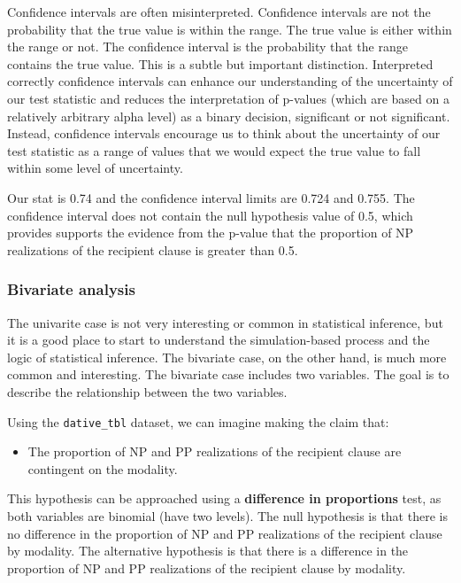 \documentclass[
  letterpaper,
]{latex/krantz}
\providecommand{\tightlist}{%
  \setlength{\itemsep}{0pt}\setlength{\parskip}{0pt}}\usepackage{longtable,booktabs,array}
\theoremstyle{definition}
\theoremstyle{remark}
\begin{document}
Confidence intervals are often misinterpreted. Confidence intervals are
not the probability that the true value is within the range. The true
value is either within the range or not. The confidence interval is the
probability that the range contains the true value. This is a subtle but
important distinction. Interpreted correctly confidence intervals can
enhance our understanding of the uncertainty of our test statistic and
reduces the interpretation of p-values (which are based on a relatively
arbitrary alpha level) as a binary decision, significant or not
significant. Instead, confidence intervals encourage us to think about
the uncertainty of our test statistic as a range of values that we would
expect the true value to fall within some level of uncertainty.

Our stat is 0.74 and the confidence interval limits are 0.724 and 0.755.
The confidence interval does not contain the null hypothesis value of
0.5, which provides supports the evidence from the p-value that the
proportion of NP realizations of the recipient clause is greater than
0.5.

\subsubsection{Bivariate analysis}\label{sec-ida-cat-bivariate}

The univarite case is not very interesting or common in statistical
inference, but it is a good place to start to understand the
simulation-based process and the logic of statistical inference. The
bivariate case, on the other hand, is much more common and interesting.
The bivariate case includes two variables. The goal is to describe the
relationship between the two variables.

Using the \texttt{dative\_tbl} dataset, we can imagine making the claim
that:

\begin{itemize}
\tightlist
\item
  The proportion of NP and PP realizations of the recipient clause are
  contingent on the modality.
\end{itemize}

This hypothesis can be approached using a \textbf{difference in
proportions} test, as both variables are binomial (have two levels). The
null hypothesis is that there is no difference in the proportion of NP
and PP realizations of the recipient clause by modality. The alternative
hypothesis is that there is a difference in the proportion of NP and PP
realizations of the recipient clause by modality.
\end{document}
